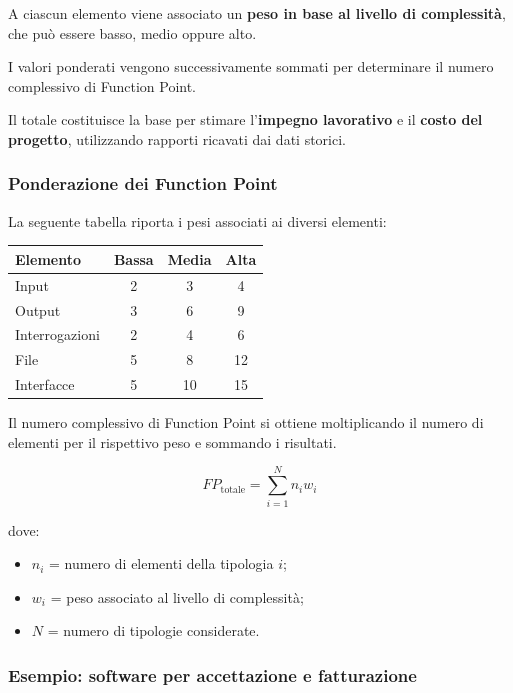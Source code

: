 \noindent A ciascun elemento viene associato un
\textbf{peso in base al livello di complessità},
che può essere basso, medio oppure alto.

\medskip

\noindent I valori ponderati vengono successivamente
sommati per determinare il numero complessivo
di Function Point.

\medskip

\noindent Il totale costituisce la base per stimare
l'\textbf{impegno lavorativo} e il \textbf{costo del progetto},
utilizzando rapporti ricavati dai dati storici.

\subsubsection*{Ponderazione dei Function Point}

\noindent La seguente tabella riporta i pesi
associati ai diversi elementi:

\begin{center}
\begin{tabular}{|l|c|c|c|}
\hline
\textbf{Elemento} &
\textbf{Bassa} &
\textbf{Media} &
\textbf{Alta} \\
\hline
Input & 2 & 3 & 4 \\
\hline
Output & 3 & 6 & 9 \\
\hline
Interrogazioni & 2 & 4 & 6 \\
\hline
File & 5 & 8 & 12 \\
\hline
Interfacce & 5 & 10 & 15 \\
\hline
\end{tabular}
\end{center}

\noindent Il numero complessivo di Function Point
si ottiene moltiplicando il numero di elementi
per il rispettivo peso e sommando i risultati.

\[
\boxed{
FP_{\text{totale}}=
\sum_{i=1}^{N}n_iw_i
}
\]

\noindent dove:

\begin{itemize}
    \item $n_i$ = numero di elementi della tipologia $i$;
    \item $w_i$ = peso associato al livello di complessità;
    \item $N$ = numero di tipologie considerate.
\end{itemize}


\subsubsection*{Esempio: software per accettazione e fatturazione}

